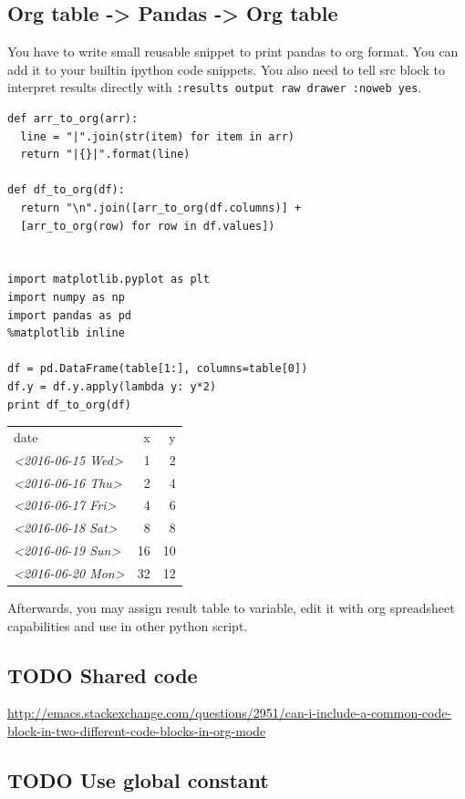 \documentclass[11pt]{article}
\begin{document}
\subsection{Org table -> Pandas -> Org table}
\label{sec:orgheadline43}
You have to write small reusable snippet to print pandas to org format.
You can add it to your builtin ipython code snippets.
You also need to tell src block to interpret results directly with \texttt{:results output raw drawer :noweb yes}.

\begin{verbatim}
def arr_to_org(arr):
  line = "|".join(str(item) for item in arr)
  return "|{}|".format(line)

def df_to_org(df):
  return "\n".join([arr_to_org(df.columns)] +
  [arr_to_org(row) for row in df.values])


import matplotlib.pyplot as plt
import numpy as np
import pandas as pd
%matplotlib inline

df = pd.DataFrame(table[1:], columns=table[0])
df.y = df.y.apply(lambda y: y*2)
print df_to_org(df)
\end{verbatim}

\begin{center}
\begin{tabular}{lrr}
date & x & y\\
\textit{<2016-06-15 Wed>} & 1 & 2\\
\textit{<2016-06-16 Thu>} & 2 & 4\\
\textit{<2016-06-17 Fri>} & 4 & 6\\
\textit{<2016-06-18 Sat>} & 8 & 8\\
\textit{<2016-06-19 Sun>} & 16 & 10\\
\textit{<2016-06-20 Mon>} & 32 & 12\\
\end{tabular}
\end{center}

Afterwards, you may assign result table to variable, edit it with org spreadsheet capabilities and use in other python script.

\subsection{{\bfseries\sffamily TODO} Shared code}
\label{sec:orgheadline44}
\url{http://emacs.stackexchange.com/questions/2951/can-i-include-a-common-code-block-in-two-different-code-blocks-in-org-mode}
\subsection{{\bfseries\sffamily TODO} Use global constant}
\label{sec:orgheadline45}
\end{document}
